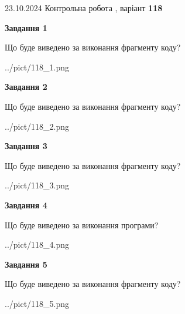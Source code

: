 \documentclass[12pt, ukrainian]{article}
\begin{document}
{\Large{23.10.2024 Контрольна робота , варіант  \No \textbf { 118 }\par}}
{
\begin {large}
{\begin {center}\textbf{Завдання 1}\end {center}}

Що буде виведено за виконання фрагменту коду?\par
\begin{center}
	{../pict/118_1.png}
\end{center}
\newpage

{\begin {center}\textbf{Завдання 2}\end {center}}

Що буде виведено за виконання фрагменту коду?\par
\begin{center}
	{../pict/118_2.png}
\end{center}
\newpage

{\begin {center}\textbf{Завдання 3}\end {center}}

Що буде виведено за виконання фрагменту коду?\par
\begin{center}
	{../pict/118_3.png}
\end{center}
\newpage

{\begin {center}\textbf{Завдання 4}\end {center}}

Що буде виведено за виконання програми?\par
\begin{center}
	{../pict/118_4.png}
\end{center}
\newpage

{\begin {center}\textbf{Завдання 5}\end {center}}

Що буде виведено за виконання фрагменту коду?\par
\begin{center}
	{../pict/118_5.png}
\end{center}
\newpage


\end{large}}
\end{document}

